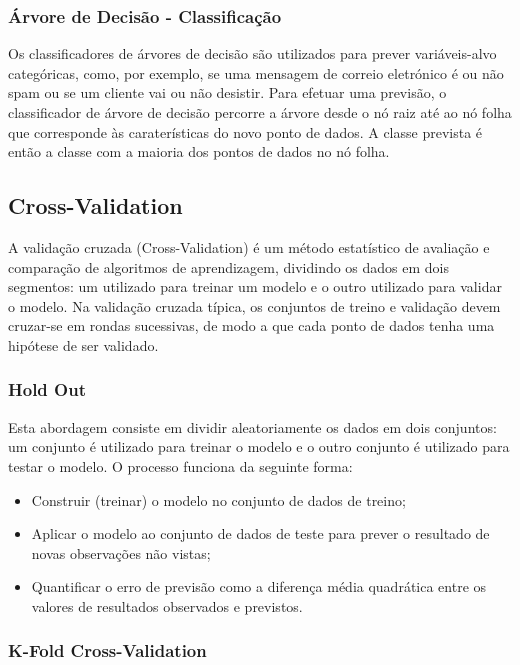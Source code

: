 \documentclass[conference]{IEEEtran}
\begin{document}
\medskip
\subsubsection{Árvore de Decisão - Classificação}

Os classificadores de árvores de decisão são utilizados para prever variáveis-alvo categóricas, como, por exemplo, se uma mensagem de correio eletrónico é ou não spam ou se um cliente vai ou não desistir. Para efetuar uma previsão, o classificador de árvore de decisão percorre a árvore desde o nó raiz até ao nó folha que corresponde às caraterísticas do novo ponto de dados. A classe prevista é então a classe com a maioria dos pontos de dados no nó folha. \cite{ohekar_what_2023}

\subsection{Cross-Validation}

A validação cruzada (Cross-Validation) é um método estatístico de avaliação e comparação de algoritmos de aprendizagem, dividindo os dados em dois segmentos: um utilizado para treinar um modelo e o outro utilizado para validar o modelo. Na validação cruzada típica, os conjuntos de treino e validação devem cruzar-se em rondas sucessivas, de modo a que cada ponto de dados tenha uma hipótese de ser validado. \cite{refaeilzadeh_cross-validation_2009}

\medskip
\subsubsection{Hold Out}

Esta abordagem consiste em dividir aleatoriamente os dados em dois conjuntos: um conjunto é utilizado para treinar o modelo e o outro conjunto é utilizado para testar o modelo. O processo funciona da seguinte forma: 
\begin{itemize}
	\item Construir (treinar) o modelo no conjunto de dados de treino; 
	\item Aplicar o modelo ao conjunto de dados de teste para prever o resultado de novas observações não vistas; 
	\item Quantificar o erro de previsão como a diferença média quadrática entre os valores de resultados observados e previstos. \cite{madureira2024cv}
\end{itemize}

\medskip
\subsubsection{K-Fold Cross-Validation}
\end{document}
